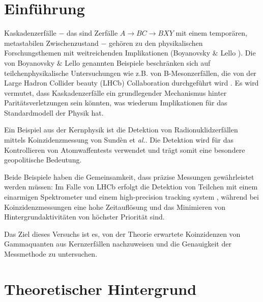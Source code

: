 \documentclass[%
aps,
onecolumn,
11pt,
tightenlines,
nofootinbib,
superscriptaddress,
floatfix,
prd,
]{revtex4-2}
\begin{document}

\section{Einführung}
\label{sec:Einführung}
Kaskadenzerfälle $-$ das sind Zerfälle $A \to BC \to BXY$ mit einem temporären, metastabilen Zwischenzustand $-$ gehören zu den physikalischen Forschungsthemen mit weitreichenden Implikationen (Boyanovsky $\&$ Lello \cite{Boyanovsky_2014}). Die von Boyanovsky $\&$ Lello genannten Beispiele beschränken sich auf teilchenphysikalische Untersuchungen wie z.B. von B-Mesonzerfällen, die von der Large Hadron Collider beauty (LHCb) Collaboration durchgeführt wird \cite{Traczyk}. Es wird vermutet, dass Kaskadenzerfälle ein grundlegender Mechanismus hinter Paritätsverletzungen sein könnten, was wiederum Implikationen für das Standardmodell der Physik hat. \par
Ein Beispiel aus der Kernphysik ist die Detektion von Radionuklidzerfällen mittels Koinzidenzmessung von Sund\`en et \textit{al.}\cite{AnderssonSunden1901549}. Die Detektion wird für das Kontrollieren von Atomwaffentests verwendet und trägt somit eine besondere geopolitische Bedeutung. \par
Beide Beispiele haben die Gemeinsamkeit, dass präzise Messungen gewährleistet werden müssen: Im Falle von LHCb erfolgt die Detektion von Teilchen mit einem einarmigen Spektrometer und einem high-precision tracking system \cite{PhysRevD.84.092001}, während bei Koinzidenzmessungen eine hohe Zeitauflösung und das Minimieren von Hintergrundaktivitäten von höchster Priorität sind.\par
Das Ziel dieses Versuchs ist es, von der Theorie erwartete Koinzidenzen von Gammaquanten aus Kernzerfällen nachzuweisen und die Genauigkeit der Messmethode zu untersuchen.




\section{Theoretischer Hintergrund}
\label{sec:Theorie}
\end{document}
